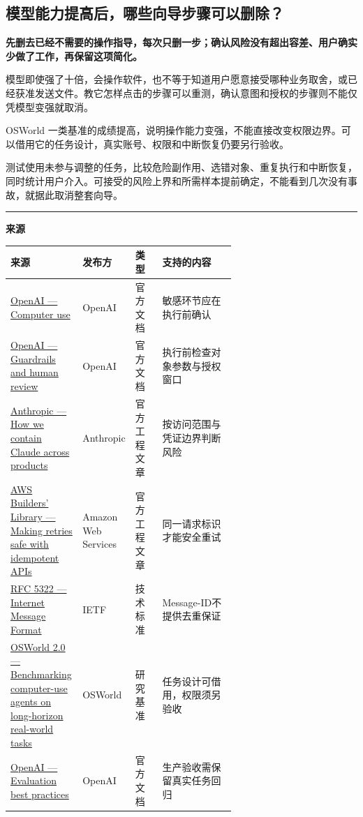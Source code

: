 \documentclass[a4paper,11pt]{ctexart}
\begin{document}
\subsection{模型能力提高后，哪些向导步骤可以删除？}
\noindent\textbf{先删去已经不需要的操作指导，每次只删一步；确认风险没有超出容差、用户确实少做了工作，再保留这项简化。}\par\medskip

模型即使强了十倍，会操作软件，也不等于知道用户愿意接受哪种业务取舍，或已经获准发送文件。教它怎样点击的步骤可以重测，确认意图和授权的步骤则不能仅凭模型变强就取消。

OSWorld 一类基准的成绩提高，说明操作能力变强，不能直接改变权限边界。可以借用它的任务设计，真实账号、权限和中断恢复仍要另行验收。

测试使用未参与调整的任务，比较危险副作用、选错对象、重复执行和中断恢复，同时统计用户介入。可接受的风险上界和所需样本提前确定，不能看到几次没有事故，就据此取消整套向导。

\bigskip\noindent\rule{\linewidth}{0.4pt}\par\smallskip
\begingroup\footnotesize\color{slate}
\textbf{来源}\par\smallskip
\setlength{\tabcolsep}{4pt}\renewcommand{\arraystretch}{1.2}\keepXColumns
\begin{tabularx}{\linewidth}{L{0.32\linewidth} L{0.20\linewidth} L{0.12\linewidth} X}
\toprule
\textbf{来源} & \textbf{发布方} & \textbf{类型} & \textbf{支持的内容} \\
\midrule
\href{https://developers.openai.com/api/docs/guides/tools-computer-use}{OpenAI — Computer use} & OpenAI & 官方文档 & 敏感环节应在执行前确认 \\
\href{https://developers.openai.com/api/docs/guides/agents/guardrails-approvals}{OpenAI — Guardrails and human review} & OpenAI & 官方文档 & 执行前检查对象参数与授权窗口 \\
\href{https://www.anthropic.com/engineering/how-we-contain-claude}{Anthropic — How we contain Claude across products} & Anthropic & 官方工程文章 & 按访问范围与凭证边界判断风险 \\
\href{https://aws.amazon.com/builders-library/making-retries-safe-with-idempotent-APIs/}{AWS Builders' Library — Making retries safe with idempotent APIs} & Amazon Web Services & 官方工程文章 & 同一请求标识才能安全重试 \\
\href{https://www.rfc-editor.org/rfc/rfc5322}{RFC 5322 — Internet Message Format} & IETF & 技术标准 & Message-ID不提供去重保证 \\
\href{https://osworld-v2.xlang.ai/}{OSWorld 2.0 — Benchmarking computer-use agents on long-horizon real-world tasks} & OSWorld & 研究基准 & 任务设计可借用，权限须另验收 \\
\href{https://developers.openai.com/api/docs/guides/evaluation-best-practices}{OpenAI — Evaluation best practices} & OpenAI & 官方文档 & 生产验收需保留真实任务回归 \\
\bottomrule
\end{tabularx}
\endgroup
\end{document}
